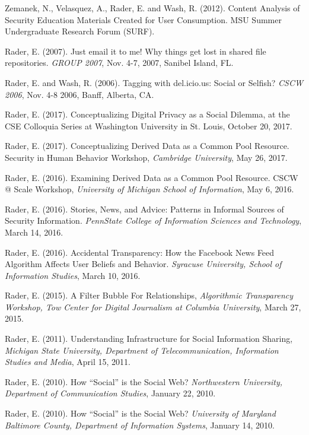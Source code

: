 \documentclass[9pt]{extarticle}
\makeatletter
\renewcommand{\section}{%
  \@startsection{section}{1}{0em}{\baselineskip}{3pt}{\large\bfseries\textsc}}
\makeatother
\begin{document}
Zemanek, N., Velasquez, A., Rader, E. and Wash, R. (2012). Content Analysis of Security Education Materials Created for User Consumption. MSU Summer Undergraduate Research Forum (SURF).
  
Rader, E. (2007). Just email it to me! Why things get lost in shared file repositories. \emph{GROUP 2007}, Nov. 4-7, 2007, Sanibel Island, FL.

Rader, E. and Wash, R. (2006). Tagging with del.icio.us: Social or Selfish? \emph{CSCW 2006}, Nov. 4-8 2006, Banff, Alberta, CA.
 

\section{External Presentations}

Rader, E. (2017). Conceptualizing Digital Privacy as a Social Dilemma, at the CSE Colloquia Series at Washington University in St. Louis, October 20, 2017.

Rader, E. (2017). Conceptualizing Derived Data as a Common Pool Resource. Security in Human Behavior Workshop, \emph{Cambridge University}, May 26, 2017.

Rader, E. (2016). Examining Derived Data as a Common Pool Resource. CSCW @ Scale Workshop, \emph{University of Michigan School of Information}, May 6, 2016.

Rader, E. (2016). Stories, News, and Advice: Patterns in Informal Sources of Security Information. \emph{PennState College of Information Sciences and Technology}, March 14, 2016.

Rader, E. (2016). Accidental Transparency: How the Facebook News Feed Algorithm Affects User Beliefs and Behavior. \emph{Syracuse University, School of Information Studies}, March 10, 2016.

Rader, E. (2015). A Filter Bubble For Relationships, \emph{Algorithmic Transparency Workshop, Tow Center for Digital Journalism at Columbia University}, March 27, 2015.

Rader, E. (2011). Understanding Infrastructure for Social Information Sharing, \emph{Michigan State University, Department of Telecommunication, Information Studies and Media}, April 15, 2011.

Rader, E. (2010). How ``Social'' is the Social Web? \emph{Northwestern University, Department of Communication Studies}, January 22, 2010.

Rader, E. (2010). How ``Social'' is the Social Web? \emph{University of Maryland Baltimore County, Department of Information Systems}, January 14, 2010.
\end{document}
